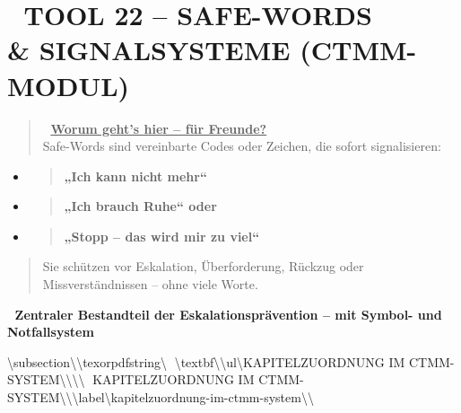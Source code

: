 \hypertarget{tool-22-safe-words-signalsysteme-ctmm-modul}{%
\section{\texorpdfstring{\textbf{🛑 TOOL 22 -- SAFE-WORDS \\& SIGNALSYSTEME (CTMM-MODUL)}}{🛑 TOOL 22 -- SAFE-WORDS \\& SIGNALSYSTEME (CTMM-MODUL)}}\label{tool-22-safe-words-signalsysteme-ctmm-modul}}

\begin{quote}
🧠 \textbf{\ul{Worum geht's hier -- für Freunde?}\\}
Safe-Words sind vereinbarte Codes oder Zeichen, die sofort signalisieren:
\end{quote}

\begin{itemize}
\item
  \begin{quote}
  \textbf{„Ich kann nicht mehr``}
  \end{quote}
\item
  \begin{quote}
  \textbf{„Ich brauch Ruhe`` oder}
  \end{quote}
\item
  \begin{quote}
  \textbf{„Stopp -- das wird mir zu viel``}
  \end{quote}
\end{itemize}

\begin{quote}
Sie schützen vor Eskalation, Überforderung, Rückzug oder Missverständnissen -- ohne viele Worte.
\end{quote}

🧩 \textbf{Zentraler Bestandteil der Eskalationsprävention -- mit Symbol- und Notfallsystem}

\hypertarget{kapitelzuordnung-im-ctmm-system}{%
\textbackslash{}subsection\textbackslash{}{\textbackslash{}texorpdfstring\textbackslash{}{📘 \textbackslash{}textbf\textbackslash{}{\textbackslash{}ul\textbackslash{}{KAPITELZUORDNUNG IM CTMM-SYSTEM\textbackslash{}}\textbackslash{}}\textbackslash{}}\textbackslash{}{📘 KAPITELZUORDNUNG IM CTMM-SYSTEM\textbackslash{}}\textbackslash{}}\textbackslash{}label\textbackslash{}{kapitelzuordnung-im-ctmm-system\textbackslash{}}\textbackslash{}}

